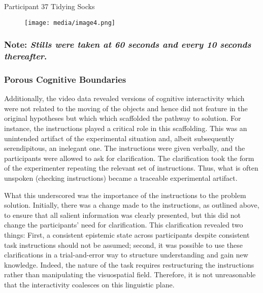 \documentclass{article}
\begin{document}
Participant 37 Tidying Socks 




\begin{figure}

  \texttt{[image: media/image4.png]}
\caption{}
\label{}


\end{figure}


\subsubsection{Note: \emph{Stills were taken at 60 seconds and every 10 seconds thereafter}.}

\subsubsection{}

\subsubsection{Porous Cognitive Boundaries}

Additionally, the video data revealed versions of cognitive interactivity which were not related to the moving of the objects and hence did not feature in the original hypotheses but which which scaffolded the pathway to solution. For instance, the instructions played a critical role in this scaffolding. This was an unintended artifact of the experimental situation and, albeit subsequently serendipitous, an inelegant one. The instructions were given verbally, and the participants were allowed to ask for clarification. The clarification took the form of the experimenter repeating the relevant set of instructions. Thus, what is often unspoken (checking instructions) became a traceable experimental artifact. 

What this underscored was the importance of the instructions to the problem solution. Initially, there was a change made to the instructions, as outlined above, to ensure that all salient information was clearly presented, but this did not change the participants' need for clarification. This clarification revealed two things: First, a consistent epistemic state across participants despite consistent task instructions should not be assumed; second, it was possible to use these clarifications in a trial-and-error way to structure understanding and gain new knowledge. Indeed, the nature of the task requires restructuring the instructions rather than manipulating the visuospatial field. Therefore, it is not unreasonable that the interactivity coalesces on this linguistic plane. 
\end{document}
